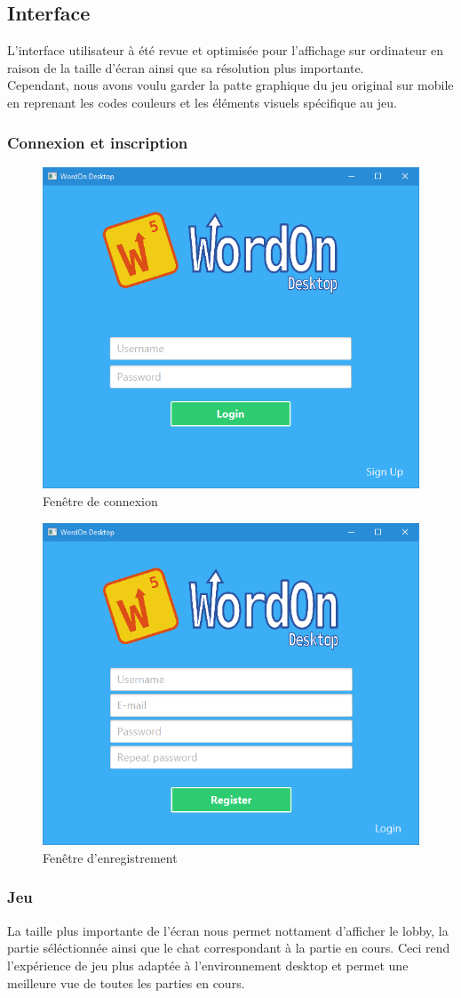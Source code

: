 \documentclass[a4paper,12pt]{article}
\begin{document}
	\subsection{Interface}
	L'interface utilisateur à été revue et optimisée pour l'affichage sur ordinateur en raison de la taille d'écran ainsi que sa résolution plus importante. \\
	Cependant, nous avons voulu garder la patte graphique du jeu original sur mobile en reprenant les codes couleurs et les éléments visuels spécifique au jeu.
	
		\subsubsection{Connexion et inscription}
		
		\begin{figure}[h]
			\centering
			\includegraphics[width=0.4\linewidth]{img/signin.jpg}
			\caption{Fenêtre de connexion}
		\end{figure}
	
		\begin{figure}[h]
			\centering
			\includegraphics[width=0.4\linewidth]{img/signup.jpg}
			\caption{Fenêtre d'enregistrement}
		\end{figure}
		
		\subsubsection{Jeu}
		La taille plus importante de l'écran nous permet nottament d'afficher le lobby, la partie séléctionnée ainsi que le chat correspondant à la partie en cours. Ceci rend l'expérience de jeu plus adaptée à l'environnement desktop et permet une meilleure vue de toutes les parties en cours.
		
\end{document}
